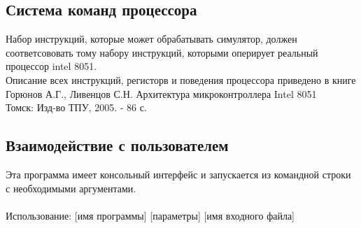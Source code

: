 \subsection{Система команд процессора}
Набор инструкций, которые может обрабатывать симулятор, должен соответсововать тому набору инструкций, которыми оперирует реальный процессор intel 8051.\\
Описание всех инструкций, регисторв и поведения процессора приведено в книге \\[5mm]
Горюнов А.Г., Ливенцов С.Н. Архитектура микроконтроллера Intel 8051 \\
Томск: Изд-во ТПУ, 2005. - 86 с. \\

\subsection{Взаимодействие с пользователем}
Эта программа имеет консольный интерфейс и запускается из командной строки с необходимыми аргументами.\\
~\\
Использование:
[имя программы] [параметры] [имя входного файла] \\


